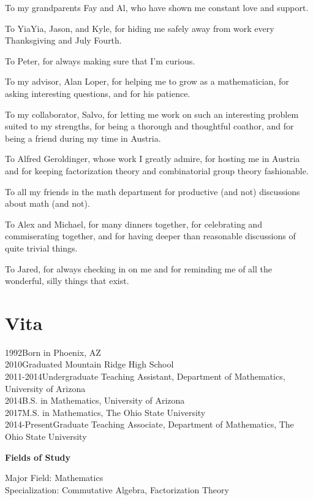 To my grandparents Fay and Al, who have shown me constant love and support.

To YiaYia, Jason, and Kyle, for hiding me safely away from work every Thanksgiving and July Fourth.

To Peter, for always making sure that I'm curious.

To my advisor, Alan Loper, for helping me to grow as a mathematician, for asking interesting questions, and for his patience.

To my collaborator, Salvo, for letting me work on such an interesting problem suited to my strengths, for being a thorough and thoughtful coathor, and for being a friend during my time in Austria.

To Alfred Geroldinger, whose work I greatly admire, for hosting me in Austria and for keeping factorization theory and combinatorial group theory fashionable.

To all my friends in the math department for productive (and not) discussions about math (and not).

To Alex and Michael, for many dinners together, for celebrating and commiserating together, and for having deeper than reasonable discussions of quite trivial things.

To Jared, for always checking in on me and for reminding me of all the wonderful, silly things that exist.  







\chapter{Vita}
1992\dotfill  Born in Phoenix, AZ \\
2010\dotfill Graduated Mountain Ridge High School \\
2011-2014\dotfill Undergraduate Teaching Assistant, Department of Mathematics, University of Arizona  \\
2014\dotfill B.S. in Mathematics, University of Arizona \\
2017\dotfill M.S. in Mathematics, The Ohio State University \\
2014-Present\dotfill Graduate Teaching Associate, Department of Mathematics, The Ohio State University \\

\begin{center}
{ \LARGE \bf Fields of Study}
\end{center}
Major Field: Mathematics\\
Specialization: Commutative Algebra, Factorization Theory